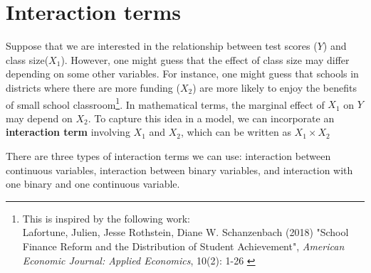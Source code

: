 \section{Interaction terms}
Suppose that we are interested in the relationship between test scores ($Y$) and class size($X_1$). However, one might guess that the effect of class size may differ depending on some other variables. For instance, one might guess that schools in districts where there are more funding ($X_2$) are more likely to enjoy the benefits of small school classroom\footnote{\scriptsize{This is inspired by the following work: \\ Lafortune, Julien, Jesse Rothstein, Diane W. Schanzenbach (2018) "School Finance Reform and the Distribution of Student Achievement", \textit{American Economic Journal: Applied Economics}, 10(2): 1-26 }}. In mathematical terms, the marginal effect of $X_1$ on $Y$ may depend on $X_2$. To capture this idea in a model, we can incorporate an \textbf{interaction term} involving $X_1$ and $X_2$, which can be written as $X_1 \times X_2$ \par\medskip
There are three types of interaction terms we can use: interaction between continuous variables, interaction between binary variables, and interaction with one binary and one continuous variable.
